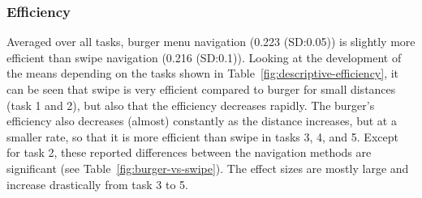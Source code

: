 \documentclass{sig-alternate-05-2015}
\begin{document}
\subsubsection{Efficiency}
Averaged over all tasks, burger menu navigation (0.223 (SD:\@0.05)) is slightly more efficient than swipe navigation (0.216 (SD:\@0.1)). Looking at the
development of the means depending on the tasks shown in Table~\ref{fig:descriptive-efficiency}, it can be seen that swipe is very efficient compared to burger for small distances (task 1 and 2), 
but also that the efficiency decreases rapidly. The burger's efficiency also decreases (almost) constantly as the distance increases, but at a smaller rate, so that it is more efficient than swipe
in tasks 3, 4, and 5. Except for task 2, these reported differences between the navigation methods are significant (see Table~\ref{fig:burger-vs-swipe}). The effect sizes are mostly large and
increase drastically from task 3 to 5.
\begin{table}[!h]
\centering
\caption{Mean (standard deviation) of efficiency}
\label{fig:descriptive-efficiency}
\end{table}
\end{document}
